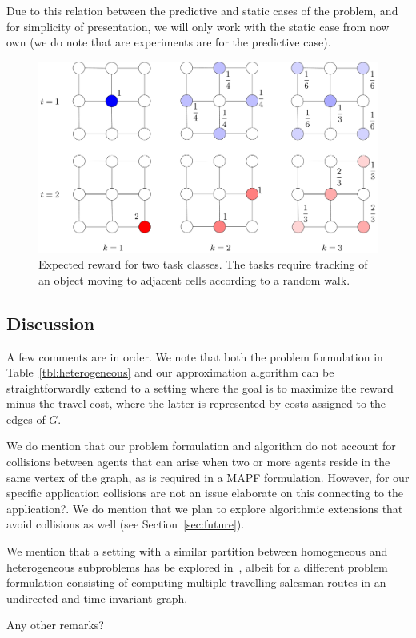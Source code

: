 \documentclass[conference]{IEEEtran}
\newcommand{\todo}[1]{{\color{red}{\bf TODO:} #1}}
\newcommand{\todo}[1]{}
\begin{document}
Due to this relation between the predictive and static cases of the problem, and for simplicity of presentation, we will only work with the static case from now own (we do note that are experiments are for the predictive case). 

\begin{figure}[h]
\centering
\includegraphics[width=.35\textwidth]{fig/distribution_and_reward.pdf}
\caption{Expected reward for two task classes. The tasks require tracking of an object moving to adjacent cells according to a random walk.}
\label{fig:distribution_and_reward}
\end{figure}

\subsection{Discussion}
A few comments are in order. We note that both the problem formulation in Table~\ref{tbl:heterogeneous} and our approximation algorithm can be straightforwardly extend to a setting where the goal is to maximize the reward minus the travel cost, where the latter is represented by costs assigned to the edges of $G$. 

We do mention that our problem formulation and algorithm do not account for collisions between agents that can arise when two or more agents reside in the same vertex of the graph, as is required in a MAPF formulation. However, for our specific application collisions are not an issue \todo{elaborate on this connecting to the application}?. We do mention that we plan to explore algorithmic extensions that avoid collisions as well (see Section~\ref{sec:future}).

We mention that a setting with a similar partition between homogeneous and heterogeneous subproblems has be explored in~\cite{PrasadETAL20}, albeit for a different problem formulation consisting of computing multiple travelling-salesman routes in an undirected and time-invariant graph. %


\todo{Any other remarks?}

\end{document}
